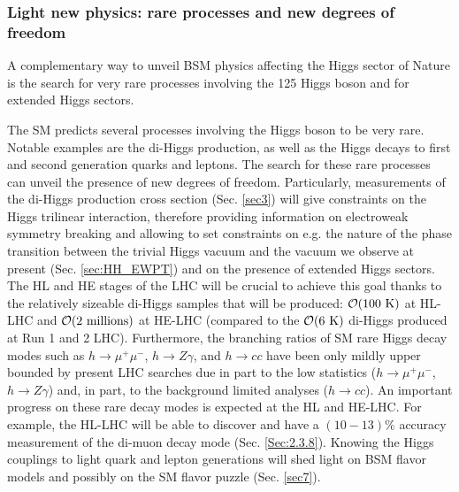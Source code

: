 \subsubsection{Light new physics: rare processes and new degrees of freedom}\label{sec:BSMintro}
A complementary way to unveil BSM physics affecting the Higgs sector of Nature is the search for very rare processes involving the 125 \UGeV Higgs boson and for extended Higgs sectors. 

The SM predicts several processes involving the Higgs boson to be very rare. Notable examples are the di-Higgs production, as well as the Higgs decays to first and second generation quarks and leptons. The search for these rare processes can unveil the presence of new degrees of freedom. Particularly, measurements of the di-Higgs production cross section (Sec. \ref{sec3}) will give constraints on the Higgs trilinear interaction, therefore providing information on electroweak symmetry breaking and allowing to set constraints on e.g. the nature of the phase transition between the trivial Higgs vacuum and the vacuum we observe at present (Sec. \ref{sec:HH_EWPT}) and on the presence of extended Higgs sectors. The HL and HE stages of the LHC will be crucial to achieve this goal thanks to the relatively sizeable di-Higgs samples that will be produced: $\mathcal O(100~{\rm{K}})$ at HL-LHC and $\mathcal O(2~{\rm{millions}})$ at HE-LHC (compared to the $\mathcal O(6~{\rm{K}})$ di-Higgs produced at Run 1 and 2 LHC). Furthermore, the branching ratios of SM rare Higgs decay modes such as $h\to\mu^+\mu^-$, $h\to Z\gamma$, and $h\to cc$ have been only mildly upper bounded by present LHC searches due in part to the low statistics ($h\to\mu^+\mu^-$, $h\to Z\gamma$) and, in part, to the background limited analyses ($h\to cc$). An important progress on these rare decay modes is expected at the HL and HE-LHC. For example, the HL-LHC will be able to discover and have a $(10-13)\%$ accuracy measurement of the di-muon decay mode (Sec. \ref{Sec:2.3.8}). Knowing the Higgs couplings to light quark and lepton generations will shed light on BSM flavor models and possibly on the SM flavor puzzle (Sec. \ref{sec7}).

